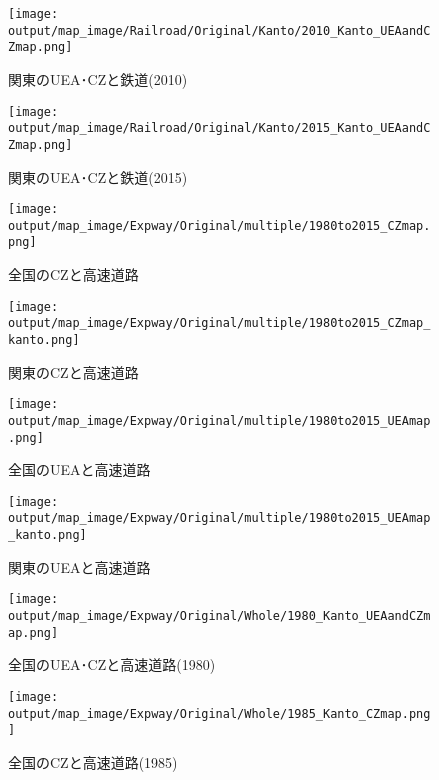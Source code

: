 \documentclass{ltjsarticle}
\begin{document}
\begin{figure}[pbth]
  \centering
  \texttt{[image: output/map\_image/Railroad/Original/Kanto/2010\_Kanto\_UEAandCZmap.png]}
  \caption{\label{2010:KanCZandUEA}関東のUEA･CZと鉄道(2010)}
\end{figure}


\begin{figure}[pbth]
  \centering
  \texttt{[image: output/map\_image/Railroad/Original/Kanto/2015\_Kanto\_UEAandCZmap.png]}
  \caption{\label{2015:KanCZandUEA}関東のUEA･CZと鉄道(2015)}
\end{figure}



\begin{figure}[pbth]
  \centering
  \texttt{[image: output/map\_image/Expway/Original/multiple/1980to2015\_CZmap.png]}
  \caption{\label{allCZandExpway}全国のCZと高速道路}
\end{figure}

\begin{figure}[pbth]
  \centering
  \texttt{[image: output/map\_image/Expway/Original/multiple/1980to2015\_CZmap\_kanto.png]}
  \caption{\label{KanCZandExpway}関東のCZと高速道路}
\end{figure}


\begin{figure}[pbth]
  \centering
  \texttt{[image: output/map\_image/Expway/Original/multiple/1980to2015\_UEAmap.png]}
  \caption{\label{allUEAandExpway}全国のUEAと高速道路}
\end{figure}


\begin{figure}[pbth]
  \centering
  \texttt{[image: output/map\_image/Expway/Original/multiple/1980to2015\_UEAmap\_kanto.png]}
  \caption{\label{KanUEAandExpway}関東のUEAと高速道路}
\end{figure}

\begin{figure}[pbth]
  \centering
  \texttt{[image: output/map\_image/Expway/Original/Whole/1980\_Kanto\_UEAandCZmap.png]}
  \caption{\label{1980:allCZandUEA}全国のUEA･CZと高速道路(1980)}
\end{figure}


\begin{figure}[pbth]
  \centering
  \texttt{[image: output/map\_image/Expway/Original/Whole/1985\_Kanto\_CZmap.png]}
  \caption{\label{1985:allCZandUEA}全国のCZと高速道路(1985)}
\end{figure}
\end{document}
